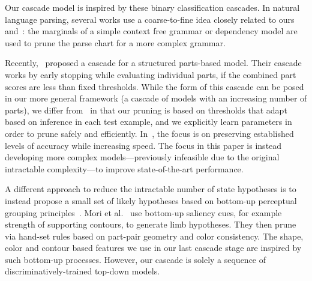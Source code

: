 Our cascade model is inspired by these binary classification cascades. In 
natural language parsing, several works \citep{carreras2008tag,petrov:PhD} use 
a coarse-to-fine idea closely related to ours and~\citet{geman2001}: the 
marginals of a simple context free grammar or dependency model are used to 
prune the parse chart for a more complex grammar.

Recently,~\citet{pff-cascade} proposed a cascade for a structured parts-based 
model.  Their cascade works by early stopping while evaluating individual 
parts, if the combined part scores are less than fixed thresholds.  While the 
form of this cascade can be posed in our more general framework (a cascade of 
models with an increasing number of parts), we differ from~\citet{pff-cascade} 
in that our pruning is based on thresholds that adapt based on inference in 
each test example, and we explicitly learn parameters in order to prune safely 
and efficiently. In~\citet{geman2001,viola02,pff-cascade}, the focus is on 
preserving established levels of accuracy while increasing speed.  The focus in 
this paper is instead developing more complex models---previously infeasible 
due to the original intractable complexity---to improve state-of-the-art 
performance.

A different approach to reduce the intractable number of state hypotheses is to instead propose a small set of likely hypotheses based on bottom-up perceptual grouping principles~\cite{mori04,Srinivasan07}.  Mori et al.~\cite{mori04} use bottom-up saliency cues, for example strength of supporting contours, to generate limb hypotheses.  They then prune via hand-set rules based on part-pair geometry and color consistency. The shape, color and contour based features we use in our last cascade stage are inspired by such bottom-up processes.  However, our cascade is solely a sequence of discriminatively-trained top-down models.



